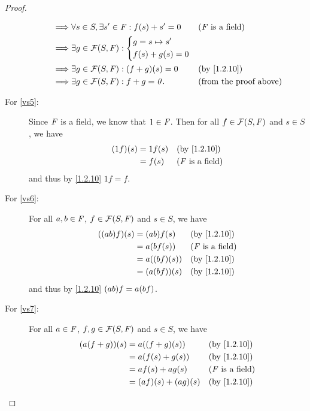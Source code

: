 \begin{proof}
\begin{description}
\begin{align*}
				\implies & \forall s \in S, \exists s' \in \F : f\p{s} + s' = 0 &  & \text{(\(\F\) is a field)}    \\
				\implies & \exists g \in \FS : \begin{dcases}
					g = s \mapsto s' \\
					f\p{s} + g\p{s} = 0
				\end{dcases}                                          \\
				\implies & \exists g \in \FS : \p{f + g}\p{s} = 0               &  & \text{(by \cref{1.2.10})}     \\
				\implies & \exists g \in \FS : f + g = \zv.                     &  & \text{(from the proof above)}
			\end{align*}
		\item[For \ref{vs5}:]
			Since \(\mathit{F}\) is a field, we know that \(1 \in \mathit{F}\).
			Then for all \(f \in \FS\) and \(s \in S\), we have
			\begin{align*}
				\p{1f}\p{s} & = 1f\p{s} &  & \text{(by \cref{1.2.10})}  \\
				            & = f\p{s}  &  & \text{(\(\F\) is a field)}
			\end{align*}
			and thus by \cref{1.2.10} \(1f = f\).
		\item[For \ref{vs6}:]
			For all \(a, b \in \mathit{F}\), \(f \in \FS\) and \(s \in S\), we have
			\begin{align*}
				\p{\p{ab} f}\p{s} & = \p{ab} f\p{s}     &  & \text{(by \cref{1.2.10})}  \\
				                  & = a \p{b f\p{s}}    &  & \text{(\(\F\) is a field)} \\
				                  & = a \p{\p{bf}\p{s}} &  & \text{(by \cref{1.2.10})}  \\
				                  & = \p{a \p{bf}}\p{s} &  & \text{(by \cref{1.2.10})}
			\end{align*}
			and thus by \cref{1.2.10} \(\p{ab} f = a \p{bf}\).
		\item[For \ref{vs7}:]
			For all \(a \in \mathit{F}\), \(f, g \in \FS\) and \(s \in S\), we have
			\begin{align*}
				\p{a \p{f + g}}\p{s} & = a \p{\p{f + g}\p{s}}      &  & \text{(by \cref{1.2.10})}  \\
				                     & = a \p{f\p{s} + g\p{s}}     &  & \text{(by \cref{1.2.10})}  \\
				                     & = af\p{s} + ag\p{s}         &  & \text{(\(\F\) is a field)} \\
				                     & = \p{af}\p{s} + \p{ag}\p{s} &  & \text{(by \cref{1.2.10})}  \\

\end{align*}
\end{description}
\end{proof}
